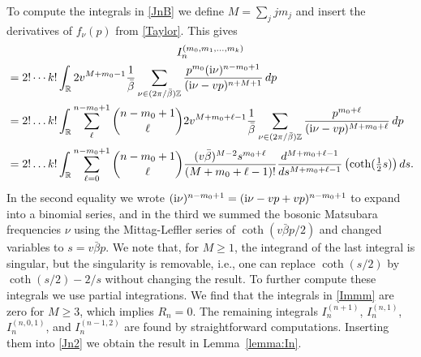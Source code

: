 \documentclass[12pt,a4paper]{article}
\newcommand{\half}{\mbox{$\frac12$}}
\newcommand{\ii}{{\rm i}}
\newcommand{\Z}{\mathbb{Z}}
\theoremstyle{definition}
\theoremstyle{remark}
\begin{document}
\begin{appendix}
To compute the integrals in \eqref{JnB} we define $M=\sum_j jm_j$ and insert the derivatives of $f_\nu(p)$ from \eqref{Taylor}. This gives
%
\begin{multline} 
\label{Immm}
I_n^{(m_0,m_1,\ldots,m_k)} \\
\begin{aligned}
& = 2!\cdots k! \int_{\mathbb{R}} 2 v^{M+m_0-1} \frac{1}{\bar\beta}
		\sum_{\nu \in (2\pi/\bar\beta)\Z} \frac{p^{m_0}
		(\ii\nu)^{n-m_0+1}}{(\ii\nu-vp)^{n+M+1} } \, dp \\
& = 2! \ldots k! \int_{\mathbb{R}} \sum_{\ell}^{n-m_0+1}
		\binom{n-m_0+1}{\ell} 2 v^{M+m_0+\ell-1}
		\frac{1}{\bar\beta} \sum_{\nu \in (2\pi/\bar\beta)\Z}
		\frac{p^{m_0+\ell}}{(\ii\nu-vp)^{M+m_0+\ell}} \, dp \\
& = 2! \ldots k! \int_{\mathbb{R}} \sum_{\ell=0}^{n-m_0+1} \binom{n-m_0+1}{\ell}
		\frac{(v\bar\beta)^{M-2}s^{m_0+\ell} }{(M+m_0+\ell-1)!}
		\frac{d^{M+m_0+\ell-1}}{ds^{M+m_0+\ell-1}} \left( \coth(\half s) \right) ds.
\end{aligned}
\end{multline} 
%
In the second equality we wrote $(\ii\nu)^{n-m_0+1} = (\ii\nu-vp+vp)^{n-m_0+1}$ to expand into a binomial series, and in the third we summed the bosonic Matsubara frequencies $\nu$ using the Mittag-Leffler series of $\coth(v\bar\beta p/2)$ and changed variables to $s = v\bar\beta p$.
We note that, for $M\geq 1$, the integrand of the last integral is singular, but the singularity is removable, i.e., one can replace $\coth(s/2)$ by $ \coth(s/2)-2/s$ without changing the result.
To further compute these integrals we use partial integrations.
We find that the integrals in \eqref{Immm} are zero for $M \geq 3$, which implies $R_n = 0$.
The remaining integrals $I_n^{(n+1)}$, $I^{(n,1)}_n$, $I_n^{(n,0,1)}$, and $I_n^{(n-1,2)}$ are found by straightforward computations.  
Inserting them into \eqref{Jn2} we obtain the result in Lemma~\ref{lemma:In}. 


\end{appendix}

\end{document}
